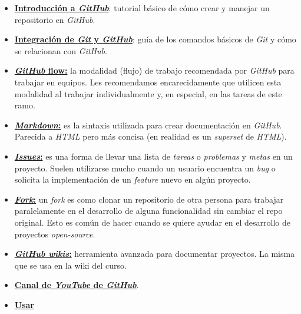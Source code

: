     \begin{itemize}
      \item \href{https://guides.github.com/activities/hello-world/}{
        \textbf{Introducción a \textit{GitHub}}}: tutorial básico de cómo crear y 
        manejar un repositorio en \textit{GitHub}. 
      \item \href{https://guides.github.com/introduction/git-handbook/}{
        \textbf{Integración de \textit{Git} y \textit{GitHub}}}: guía de los comandos 
        básicos de \textit{Git} y cómo se relacionan con \textit{GitHub}.
      \item \href{https://guides.github.com/introduction/flow/}{\textbf{
        \textit{GitHub} flow:}} la modalidad (flujo) de trabajo recomendada por 
        \textit{GitHub} para trabajar en equipos.
        Les recomendamos encarecidamente que utilicen esta modalidad al trabajar 
        individualmente y, en especial, en las tareas de este ramo.
      \item \href{https://guides.github.com/features/mastering-markdown/}{
        \textbf{\textit{Markdown}:}} es la sintaxis utilizada para crear documentación
        en \textit{GitHub}.
        Parecida a \textit{HTML} pero más concisa (en realidad es un \textit{superset}
        de \textit{HTML}). 
      \item \href{https://guides.github.com/features/issues/}{
        \textbf{\textit{Issues}:}} es una forma de llevar una lista de \textit{tareas}
        o \textit{problemas} y \textit{metas} en un proyecto.
        Suelen utilizarse mucho cuando un usuario encuentra un \textit{bug} o solicita
        la implementación de un \textit{feature} nuevo en algún proyecto.
      \item \href{https://guides.github.com/activities/forking/}{
        \textbf{\textit{Fork}:}} un \textit{fork} es como clonar un repositorio de 
        otra persona para trabajar paralelamente en el desarrollo de alguna 
        funcionalidad sin cambiar el repo original.
        Esto es común de hacer cuando se quiere ayudar en el desarrollo de proyectos 
        \textit{open-source}.
      \item \href{https://guides.github.com/features/wikis/}{
        \textbf{\textit{GitHub wikis}:}} herramienta avanzada para documentar 
        proyectos.
        La misma que se usa en la wiki del curso. 
      \item \href{https://www.youtube.com/githubguides}{\textbf{Canal de 
        \textit{YouTube} de \textit{GitHub}}}.
      \item \href{https://www.youtube.com/watch?v=uUzRMOCBorg}{\textbf{Usar 
}}
\end{itemize}
